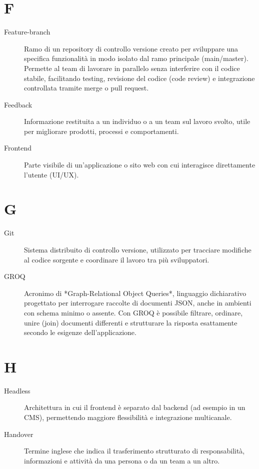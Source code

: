 \section*{F}
\begin{description}
    \item[Feature-branch] Ramo di un repository di controllo versione creato per sviluppare una specifica funzionalità in modo isolato dal ramo principale (main/master). Permette al team di lavorare in parallelo senza interferire con il codice stabile, facilitando testing, revisione del codice (code review) e integrazione controllata tramite merge o pull request.
    \item[Feedback] Informazione restituita a un individuo o a un team sul lavoro svolto, utile per migliorare prodotti, processi e comportamenti.
    \item[Frontend] Parte visibile di un’applicazione o sito web con cui interagisce direttamente l’utente (UI/UX).
\end{description}

\section*{G}
\begin{description}
    \item[Git] Sistema distribuito di controllo versione, utilizzato per tracciare modifiche al codice sorgente e coordinare il lavoro tra più sviluppatori.
    \item[GROQ] Acronimo di *Graph-Relational Object Queries*, linguaggio dichiarativo progettato per interrogare raccolte di documenti JSON, anche in ambienti con schema minimo o assente. 
    Con GROQ è possibile filtrare, ordinare, unire (join) documenti differenti e strutturare la risposta esattamente secondo le esigenze dell’applicazione.  
    
\end{description}

\section*{H}
\begin{description}
    \item[Headless] Architettura in cui il frontend è separato dal backend (ad esempio in un CMS), permettendo maggiore flessibilità e integrazione multicanale.
    \item[Handover] Termine inglese che indica il trasferimento strutturato di responsabilità, informazioni e attività da una persona o da un team a un altro.

\end{description}

